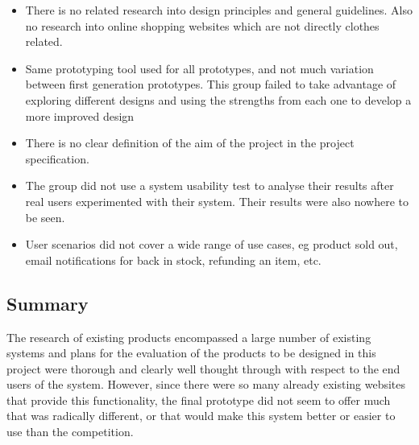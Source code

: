 \begin{itemize}

	\item There is no related research into design principles and general
	guidelines. Also no research into online shopping websites which are not
	directly clothes related.

	\item Same prototyping tool used for all prototypes, and not much variation
	between first generation prototypes. This group failed to take advantage of
	exploring different designs and using the strengths from each one to
	develop a more improved design

	\item There is no clear definition of the aim of the project in the project
	specification.

	\item The group did not use a system usability test to analyse their
	results after real users experimented with their system. Their results were
	also nowhere to be seen.

	\item User scenarios did not cover a wide range of use cases, eg product
	sold out, email notifications for back in stock, refunding an item, etc.

\end{itemize}

\subsection{Summary}

The research of existing products encompassed a large number of existing
systems and plans for the evaluation of the products to be designed in this
project were thorough and clearly well thought through with respect to the end
users of the system. However, since there were so many already existing
websites that provide this functionality, the final prototype did not seem to
offer much that was radically different, or that would make this system better
or easier to use than the competition.
